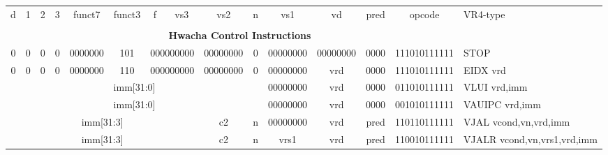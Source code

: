 \begin{landscape}
\begin{table}[p]
\begin{small}
\begin{center}
\begin{tabular}{p{0.08in}@{}p{0.08in}@{}p{0.08in}@{}p{0.08in}@{}p{0.50in}@{}p{0.30in}@{}p{0.08in}@{}p{0.8in}@{}p{0.48in}@{}p{0.32in}@{}p{0.08in}@{}p{0.8in}@{}p{0.8in}@{}p{0.4in}@{}p{0.56in}l}
\multicolumn{1}{|c|}{d} &
\multicolumn{1}{c|}{1} &
\multicolumn{1}{c|}{2} &
\multicolumn{1}{c|}{3} &
\multicolumn{1}{c|}{funct7} &
\multicolumn{1}{c|}{funct3} &
\multicolumn{1}{c|}{f} &
\multicolumn{1}{c|}{vs3} &
\multicolumn{2}{c|}{vs2} &
\multicolumn{1}{c|}{n} &
\multicolumn{1}{c|}{vs1} &
\multicolumn{1}{c|}{vd} &
\multicolumn{1}{c|}{pred} &
\multicolumn{1}{c|}{opcode} &
VR4-type \\
\cline{1-15}


&
\multicolumn{14}{c}{} & \\
&
\multicolumn{14}{c}{\bf Hwacha Control Instructions} & \\
\cline{1-15}
  

\multicolumn{1}{|c|}{0} &
\multicolumn{1}{c|}{0} &
\multicolumn{1}{c|}{0} &
\multicolumn{1}{c|}{0} &
\multicolumn{1}{c|}{0000000} &
\multicolumn{1}{c|}{101} &
\multicolumn{2}{c|}{000000000} &
\multicolumn{2}{c|}{00000000} &
\multicolumn{1}{c|}{0} &
\multicolumn{1}{c|}{00000000} &
\multicolumn{1}{c|}{00000000} &
\multicolumn{1}{c|}{0000} &
\multicolumn{1}{c|}{111010111111} & STOP  \\
\cline{1-15}
  

\multicolumn{1}{|c|}{0} &
\multicolumn{1}{c|}{0} &
\multicolumn{1}{c|}{0} &
\multicolumn{1}{c|}{0} &
\multicolumn{1}{c|}{0000000} &
\multicolumn{1}{c|}{110} &
\multicolumn{2}{c|}{000000000} &
\multicolumn{2}{c|}{00000000} &
\multicolumn{1}{c|}{0} &
\multicolumn{1}{c|}{00000000} &
\multicolumn{1}{c|}{vrd} &
\multicolumn{1}{c|}{0000} &
\multicolumn{1}{c|}{111010111111} & EIDX vrd \\
\cline{1-15}
  

\multicolumn{11}{|c|}{imm[31:0]} &
\multicolumn{1}{c|}{00000000} &
\multicolumn{1}{c|}{vrd} &
\multicolumn{1}{c|}{0000} &
\multicolumn{1}{c|}{011010111111} & VLUI vrd,imm \\
\cline{1-15}
  

\multicolumn{11}{|c|}{imm[31:0]} &
\multicolumn{1}{c|}{00000000} &
\multicolumn{1}{c|}{vrd} &
\multicolumn{1}{c|}{0000} &
\multicolumn{1}{c|}{001010111111} & VAUIPC vrd,imm \\
\cline{1-15}
  

\multicolumn{9}{|c|}{imm[31:3]} &
\multicolumn{1}{c|}{c2} &
\multicolumn{1}{c|}{n} &
\multicolumn{1}{c|}{00000000} &
\multicolumn{1}{c|}{vrd} &
\multicolumn{1}{c|}{pred} &
\multicolumn{1}{c|}{110110111111} & VJAL vcond,vn,vrd,imm \\
\cline{1-15}
  

\multicolumn{9}{|c|}{imm[31:3]} &
\multicolumn{1}{c|}{c2} &
\multicolumn{1}{c|}{n} &
\multicolumn{1}{c|}{vrs1} &
\multicolumn{1}{c|}{vrd} &
\multicolumn{1}{c|}{pred} &
\multicolumn{1}{c|}{110010111111} & VJALR vcond,vn,vrs1,vrd,imm \\
\cline{1-15}
  


\end{tabular}
\end{center}
\end{small}
\end{table}
\end{landscape}
